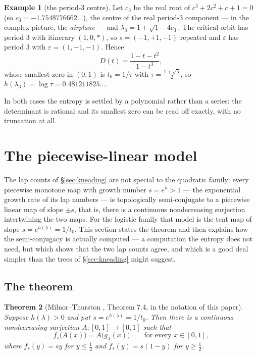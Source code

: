 \documentclass[11pt]{article}
\theoremstyle{plain}
\newtheorem{theorem}{Theorem}[section]
\theoremstyle{definition}
\newtheorem{example}[theorem]{Example}
\newcommand{\eps}{\varepsilon}
\begin{document}
\begin{example}[the period-3 centre]\label{ex:p3}
Let $c_3$ be the real root of $c^3+2c^2+c+1=0$ (so $c_3=-1.7548776662\ldots$), the centre
of the real period-$3$ component --- in the complex picture, the \emph{airplane} --- and
$\lambda_3=1+\sqrt{1-4c_3}$.  The critical orbit has
period $3$ with itinerary $(1,0,*)$,
so $s=(-1,+1,-1)$ repeated and $\eps$ has period $3$ with $\eps=(1,-1,-1)$.  Hence
\[
  D(t)=\frac{1-t-t^2}{1-t^3},
\]
whose smallest zero in $(0,1)$ is $t_0=1/\tau$ with $\tau=\tfrac{1+\sqrt5}{2}$, so
$h(\lambda_3)=\log\tau=0.481211825\ldots$.
\end{example}

In both cases the entropy is settled by a polynomial rather than a series: the determinant
is rational and its smallest zero can be read off exactly, with no truncation at all.

\section{The piecewise-linear model}\label{sec:model}

The lap counts of \S\ref{sec:kneading} are not special to the quadratic family: every
piecewise monotone map with growth number $s=e^{h}>1$ --- the exponential growth rate of its
lap numbers --- is topologically semi-conjugate to a piecewise linear map of slope $\pm s$,
that is, there is a continuous nondecreasing surjection intertwining the two maps.  For the
logistic family that model is the tent map of
slope $s=e^{h(\lambda)}=1/t_{0}$.  This section states the theorem and then explains how the
semi-conjugacy is actually computed --- a computation the entropy does not need, but which
shows that the two lap counts agree, and which is a good deal simpler than the trees of
\S\ref{sec:kneading} might suggest.

\subsection{The theorem}

\begin{theorem}[Milnor--Thurston \cite{MT}, Theorem 7.4, in the notation of this paper]\label{thm:model}
Suppose $h(\lambda)>0$ and put $s=e^{h(\lambda)}=1/t_0$.  Then there is a continuous
nondecreasing surjection $A:[0,1]\to[0,1]$ such that
\[
  f_s\bigl(A(x)\bigr)=A\bigl(g_\lambda(x)\bigr)\qquad\text{for every } x\in[0,1],
\]
where $f_s(y)=sy$ for $y\le\tfrac12$ and $f_s(y)=s(1-y)$ for $y\ge\tfrac12$.
\end{theorem}
\end{document}
